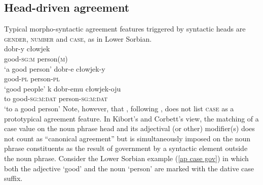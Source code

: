 \subsection{Head\hyp{}driven agreement}
\label{head-driven agreement}
Typical morpho-syntactic agreement features triggered by syntactic heads are \textsc{gender, number} and \textsc{case}, as in Lower Sorbian.
\ea
\label{sorbian agr}
\\
\ea
\gll	dobr-y cłowjek\\
	good-\textsc{sg:m} person(\textsc{m})\\
\glt	‘a good person’
\ex
\gll	dobr-e cłowjek-y\\
	good-\textsc{pl} person-\textsc{pl}\\
\glt	‘good people’
\ex
\label{ap case gov}
\gll	k dobr-emu cłowjek-oju\\
	to good-\textsc{sg:m:dat} person-\textsc{sg:m:dat}\\
\glt	‘to a good person’
\z
\z 
Note, however, that \citet{kibort2010a}, following \citet[133–135]{corbett2006}, does not list \textsc{case} as a prototypical agreement feature. In Kibort's and Corbett's view, the matching of a case value on the noun phrase head and its adjectival (or other) modifier(s) does not count as “canonical agreement” but is simultaneously imposed on the noun phrase constituents as the result of government by a syntactic element outside the noun phrase. Consider the Lower Sorbian example (\ref{ap case gov}) in which both the adjective ‘good’ and the noun ‘person’ are marked with the dative case suffix.

